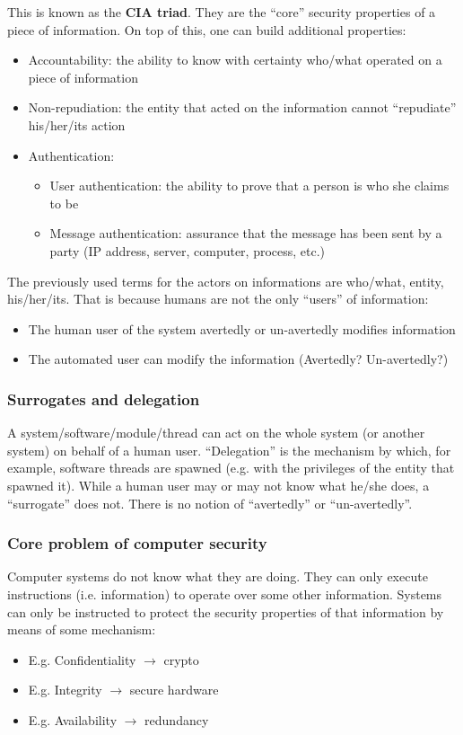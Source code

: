 \documentclass[a4paper, 10pt, titlepage]{article}
\begin{document}
This is known as the \textbf{CIA triad}. They are the “core”
security properties of a piece of information. On top of this, one can build additional properties:
\begin{itemize}
	\item Accountability: the ability to know with certainty who/what operated on a piece of information
	\item Non-repudiation: the entity that acted on the information cannot “repudiate” his/her/its action
	\item Authentication: 
		\begin{itemize}
			\item User authentication: the ability to prove that a person is who she claims to be
			\item Message authentication: assurance that the message has been sent by a party (IP address, server, computer, process, etc.)
		\end{itemize}
\end{itemize}
The previously used terms for the actors on informations are who/what, entity, his/her/its. That is because humans are not the only “users” of information:
\begin{itemize}
	\item The human user of the system avertedly or un-avertedly
	modifies information
	\item The automated user can modify the information (Avertedly? Un-avertedly?)
\end{itemize}
\subsubsection*{Surrogates and delegation}
A system/software/module/thread can act on the whole system (or another system) on behalf of a human user. “Delegation” is the mechanism by which, for example, software threads are spawned (e.g. with the privileges of the entity that spawned it). While a human user may or may not know what he/she does, a “surrogate” does not. There is no notion of “avertedly” or “un-avertedly”.

\subsubsection*{Core problem of computer security}
Computer systems do not know what they are doing. They can only execute instructions (i.e. information) to operate over some other information. Systems can only be instructed to protect the
security properties of that information by means of some mechanism:
\begin{itemize}
	\item E.g. Confidentiality $\rightarrow$ crypto
	\item E.g. Integrity $\rightarrow$ secure hardware
	\item E.g. Availability $\rightarrow$ redundancy
\end{itemize}
\end{document}
